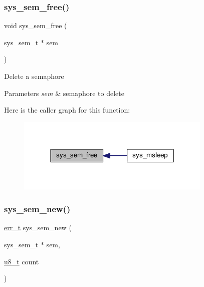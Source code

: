 \subsubsection{\texorpdfstring{sys\+\_\+sem\+\_\+free()}{sys\_sem\_free()}}
{\footnotesize\ttfamily void sys\+\_\+sem\+\_\+free (\begin{DoxyParamCaption}\item[{sys\+\_\+sem\+\_\+t $\ast$}]{sem }\end{DoxyParamCaption})}

Delete a semaphore 
\begin{DoxyParams}{Parameters}
{\em sem} & semaphore to delete \\
\hline
\end{DoxyParams}
Here is the caller graph for this function\+:
\nopagebreak
\begin{figure}[H]
\begin{center}
\leavevmode
\includegraphics[width=263pt]{group__sys__sem_ga83b781f96c30e915c752065a757da283_icgraph}
\end{center}
\end{figure}
\mbox{\label{group__sys__sem_gaf99da9e34a71855285c535183133dfde}} 
\subsubsection{\texorpdfstring{sys\+\_\+sem\+\_\+new()}{sys\_sem\_new()}}
{\footnotesize\ttfamily \hyperlink{group__infrastructure__errors_gaf02d9da80fd66b4f986d2c53d7231ddb}{err\+\_\+t} sys\+\_\+sem\+\_\+new (\begin{DoxyParamCaption}\item[{sys\+\_\+sem\+\_\+t $\ast$}]{sem,  }\item[{\hyperlink{group__compiler__abstraction_ga4caecabca98b43919dd11be1c0d4cd8e}{u8\+\_\+t}}]{count }\end{DoxyParamCaption})}

